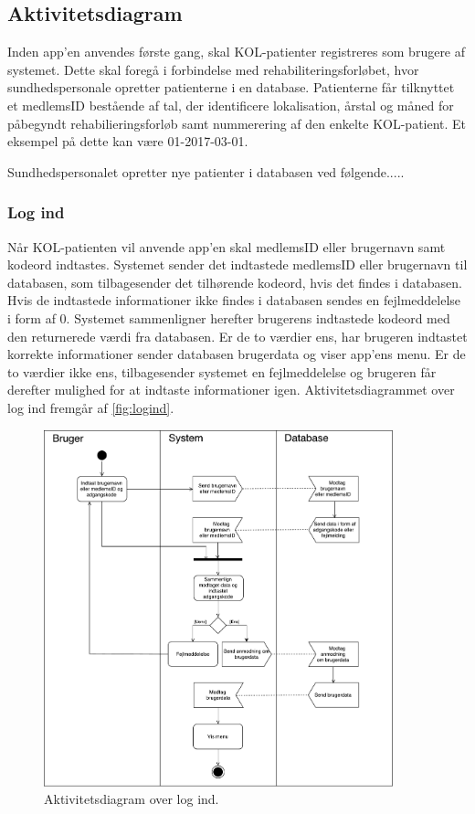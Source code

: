 \subsection{Aktivitetsdiagram}
Inden app'en anvendes første gang, skal KOL-patienter registreres som brugere af systemet. Dette skal foregå i forbindelse med rehabiliteringsforløbet, hvor sundhedspersonale opretter patienterne i en database. Patienterne får tilknyttet et medlemsID bestående af tal, der identificere lokalisation, årstal og måned for påbegyndt rehabilieringsforløb samt nummerering af den enkelte KOL-patient. Et eksempel på dette kan være 01-2017-03-01. 

Sundhedspersonalet opretter nye patienter i databasen ved følgende.....

\subsubsection{Log ind}
Når KOL-patienten vil anvende app'en skal medlemsID eller brugernavn samt kodeord indtastes. Systemet sender det indtastede medlemsID eller brugernavn til databasen, som tilbagesender det tilhørende kodeord, hvis det findes i databasen. Hvis de indtastede informationer ikke findes i databasen sendes en fejlmeddelelse i form af 0. Systemet sammenligner herefter brugerens indtastede kodeord med den returnerede værdi fra databasen. Er de to værdier ens, har brugeren indtastet korrekte informationer sender databasen brugerdata og viser app'ens menu. Er de to værdier ikke ens, tilbagesender systemet en fejlmeddelelse og brugeren får derefter mulighed for at indtaste informationer igen. Aktivitetsdiagrammet over log ind fremgår af  \autoref{fig:logind}.

\begin{figure} [H]
\centering
\includegraphics[width=0.9\textwidth]{figures/aktivitetsdiagram/Logind}
\caption{Aktivitetsdiagram over log ind.}
\label{fig:Logind}
\end{figure}



